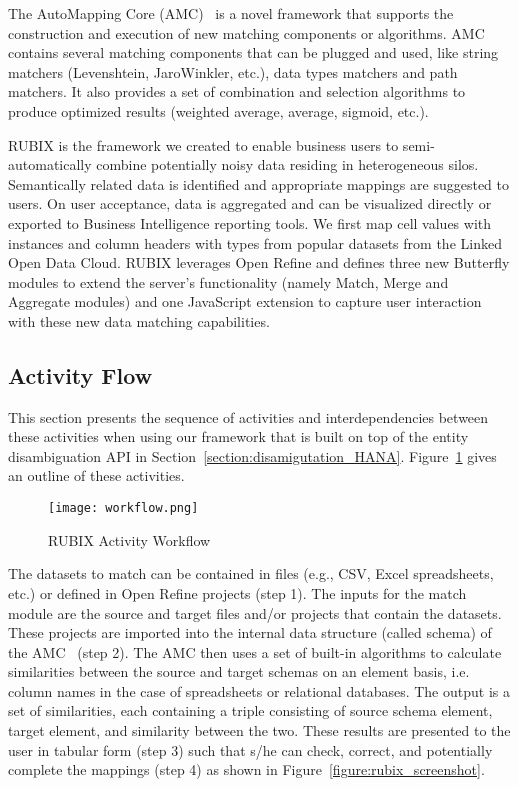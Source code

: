 The AutoMapping Core (AMC)~\cite{Peukert:ICDE:12} is a novel framework that supports the construction and execution of new matching components or algorithms. AMC contains several matching components that can be plugged and used, like string matchers (Levenshtein, JaroWinkler, etc.), data types matchers and path matchers. It also provides a set of combination and selection algorithms to produce optimized results (weighted average, average, sigmoid,  etc.).

RUBIX is the framework we created to enable business users to semi-automatically combine potentially noisy data residing in heterogeneous silos. Semantically related data is identified and appropriate mappings are suggested to users. On user acceptance, data is aggregated and can be visualized directly or exported to Business Intelligence reporting tools. We first map cell values with instances and column headers with types from popular datasets from the Linked Open Data Cloud. RUBIX leverages Open Refine and defines three new Butterfly modules to extend the server's functionality (namely Match, Merge and Aggregate modules) and one JavaScript extension to capture user interaction with these new data matching capabilities.

\subsection{Activity Flow}
This section presents the sequence of activities and interdependencies between these activities when using our framework that is built on top of the entity disambiguation API in Section~\ref{section:disamigutation_HANA}. Figure~\ref{figure:Activity_workflow} gives an outline of these activities.

\begin{figure}[ht!]
  \centering
    \texttt{[image: workflow.png]}
  \caption{RUBIX Activity Workflow}
  \label{figure:Activity_workflow}
\end{figure}

The datasets to match can be contained in files (e.g., CSV, Excel spreadsheets, etc.) or defined in Open Refine projects (step 1). The inputs for the match module are the source and target files and/or projects that contain the datasets. These projects are imported into the internal data structure (called schema) of the AMC~\cite{Peukert:ICDE:11} (step 2). The AMC then uses a set of built-in algorithms to calculate similarities between the source and target schemas on an element basis, i.e. column names in the case of spreadsheets or relational databases. The output is a set of similarities, each containing a triple consisting of source schema element, target element, and similarity between the two. These results are presented to the user in tabular form (step 3) such that s/he can check, correct, and potentially complete the mappings (step 4) as shown in Figure~\ref{figure:rubix_screenshot}.

